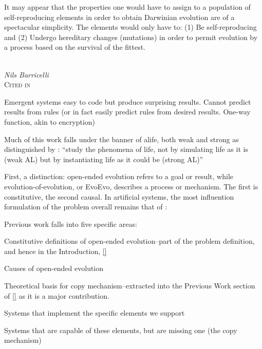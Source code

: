 \epigraph{%
It may appear that the properties one would have to assign to a population of self-reproducing elements in order to obtain Darwinian evolution are of a spectacular simplicity. The elements would only have to: (1) Be self-reproducing and (2) Undergo hereditary changes (mutations) in order to permit evolution by a process based on the survival of the fittest.}%
{\textit{\\Nils Barricelli}\\\textsc{Cited in \cite{Taylor2001}}}

Emergent systems easy to code but produce surprising results. Cannot predict results from rules (or in fact easily predict rules from desired results. One-way function, akin to encryption) \parencite{Nellis2014}

Much of this work falls under the banner of \gls{alife}, both weak and strong as distinguished by \cite{Langton1989}: ``study the phenomena of life, not by simulating life as it is (weak AL) but by instantiating life as it could be (strong AL)''

First, a distinction: open-ended evolution refers to a goal or result, while evolution-of-evolution, or EvoEvo, describes a process or mechanism. The first is constitutive, the second causal. In artificial systems, the most influention formulation of the problem overall remains that of \cite{Bedau:2000mi}:


Previous work falls into five specific areas:
\begin{compactenum}
\item Constitutive definitions of open-ended evolution--part of the problem definition, and hence in the Introduction, \ref{}
\item Causes of open-ended evolution
\item Theoretical basis for copy mechanism--extracted into the Previous Work section of \ref{} as it is a major contribution.
\item Systems that implement the specific elements we support
\item Systems that are capable of these elements, but are missing one (the copy mechanism)
\end{compactenum}

